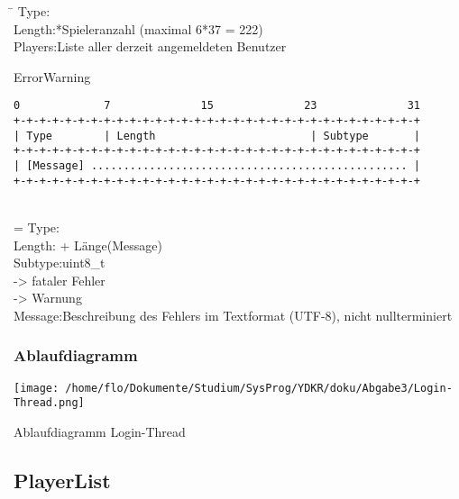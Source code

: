 \documentclass[a4paper,10pt]{article}
\begin{document}
\begin{tabbing}
 \hspace{2 cm}\=\kill
Type:\\
Length:*Spieleranzahl (maximal 6*37 = 222)\\ 
Players:\>Liste aller derzeit angemeldeten Benutzer
\end{tabbing}

\newpage

$~~$\\ErrorWarning

\begin{Verbatim}[fontfamily=courier]
 0             7              15              23              31
+-+-+-+-+-+-+-+-+-+-+-+-+-+-+-+-+-+-+-+-+-+-+-+-+-+-+-+-+-+-+-+
| Type        | Length                        | Subtype       |
+-+-+-+-+-+-+-+-+-+-+-+-+-+-+-+-+-+-+-+-+-+-+-+-+-+-+-+-+-+-+-+
| [Message] ................................................. |
+-+-+-+-+-+-+-+-+-+-+-+-+-+-+-+-+-+-+-+-+-+-+-+-+-+-+-+-+-+-+-+
\end{Verbatim}

\begin{tabbing}
 \hspace*{2 cm}\=\\=\kill
Type:\\
Length: + Länge(Message)\\
Subtype:\>uint8\_t\\
 -> fataler Fehler\\
 -> Warnung\\
Message:\>Beschreibung des Fehlers im Textformat (UTF-8), nicht nullterminiert
\end{tabbing}

\subsubsection{Ablaufdiagramm}

\begin{center}
 \texttt{[image: /home/flo/Dokumente/Studium/SysProg/YDKR/doku/Abgabe3/Login-Thread.png]}
\end{center}

Ablaufdiagramm Login-Thread

\subsection{PlayerList}
\end{document}
